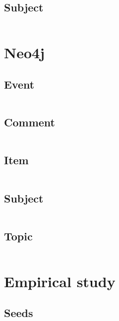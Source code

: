 \subsection*{Subject}
\inputminted[baselinestretch=1,fontsize=\footnotesize]{ruby}{app/app/models/couch_db/subject.rb}

\clearpage{}
\section{Neo4j}
\label{sec:source-neo4j}

\subsection*{Event}
\inputminted[baselinestretch=1,fontsize=\footnotesize]{ruby}{app/app/models/neo4j/event.rb}

\subsection*{Comment}
\inputminted[baselinestretch=1,fontsize=\footnotesize]{ruby}{app/app/models/neo4j/comment.rb}

\subsection*{Item}
\inputminted[baselinestretch=1,fontsize=\footnotesize]{ruby}{app/app/models/neo4j/item.rb}

\subsection*{Subject}
\inputminted[baselinestretch=1,fontsize=\footnotesize]{ruby}{app/app/models/neo4j/subject.rb}

\subsection*{Topic}
\inputminted[baselinestretch=1,fontsize=\footnotesize]{ruby}{app/app/models/neo4j/topic.rb}

\clearpage{}
\section{Empirical study}
\label{sec:source-empirical-study}

\subsection*{Seeds}
\inputminted[baselinestretch=1,fontsize=\footnotesize]{ruby}{app/db/seeds.rb}

